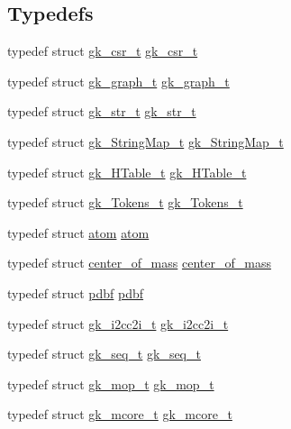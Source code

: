 \subsection*{Typedefs}
\begin{DoxyCompactItemize}
\item 
typedef struct \hyperlink{a00634}{gk\+\_\+csr\+\_\+t} \hyperlink{a00080_af9b3bb786bbe9c9b8ca7943c7d2136b6}{gk\+\_\+csr\+\_\+t}
\item 
typedef struct \hyperlink{a00638}{gk\+\_\+graph\+\_\+t} \hyperlink{a00080_a0e5ba30d21e3af8eca974c0332d34d94}{gk\+\_\+graph\+\_\+t}
\item 
typedef struct \hyperlink{a00642}{gk\+\_\+str\+\_\+t} \hyperlink{a00080_aff34a7fec41d93d84b9f8346113348d3}{gk\+\_\+str\+\_\+t}
\item 
typedef struct \hyperlink{a00646}{gk\+\_\+\+String\+Map\+\_\+t} \hyperlink{a00080_ac2f7776e0befb95eeb9c847b40800468}{gk\+\_\+\+String\+Map\+\_\+t}
\item 
typedef struct \hyperlink{a00650}{gk\+\_\+\+H\+Table\+\_\+t} \hyperlink{a00080_acccaa0bedf519acc33171fb2ff3d1172}{gk\+\_\+\+H\+Table\+\_\+t}
\item 
typedef struct \hyperlink{a00654}{gk\+\_\+\+Tokens\+\_\+t} \hyperlink{a00080_a96118ff981110ae309e40404b804d2c8}{gk\+\_\+\+Tokens\+\_\+t}
\item 
typedef struct \hyperlink{a00658}{atom} \hyperlink{a00080_a2bd36672d2068b06a725b950edffe391}{atom}
\item 
typedef struct \hyperlink{a00662}{center\+\_\+of\+\_\+mass} \hyperlink{a00080_af86e43c1f7d8f99053de6fe4d93669b7}{center\+\_\+of\+\_\+mass}
\item 
typedef struct \hyperlink{a00666}{pdbf} \hyperlink{a00080_a8ca66dd1e15a4372a231b09f6302d8ef}{pdbf}
\item 
typedef struct \hyperlink{a00670}{gk\+\_\+i2cc2i\+\_\+t} \hyperlink{a00080_a3c9bf7e9578982709bf6e6b4c1507029}{gk\+\_\+i2cc2i\+\_\+t}
\item 
typedef struct \hyperlink{a00674}{gk\+\_\+seq\+\_\+t} \hyperlink{a00080_a987f8c87e0dda65d43a8b5c6b56dcfbc}{gk\+\_\+seq\+\_\+t}
\item 
typedef struct \hyperlink{a00678}{gk\+\_\+mop\+\_\+t} \hyperlink{a00080_a5139aff4a7772eefb88d15a3fe266e51}{gk\+\_\+mop\+\_\+t}
\item 
typedef struct \hyperlink{a00682}{gk\+\_\+mcore\+\_\+t} \hyperlink{a00080_a344c3bd385c76cdaf70d77316c82b48c}{gk\+\_\+mcore\+\_\+t}
\end{DoxyCompactItemize}


